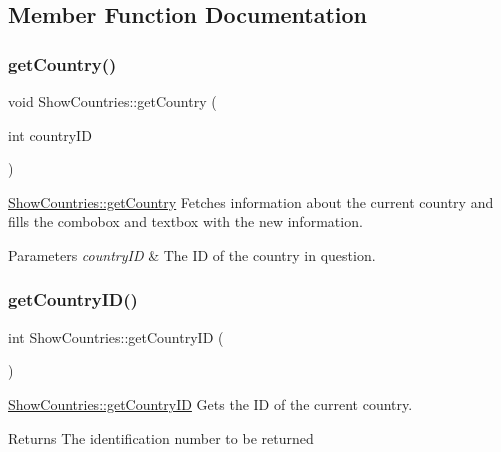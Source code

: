 \subsection{Member Function Documentation}
\mbox{\label{class_show_countries_a5f39325688b0e71fa613d5b33810ce02}} 
\subsubsection{\texorpdfstring{get\+Country()}{getCountry()}}
{\footnotesize\ttfamily void Show\+Countries\+::get\+Country (\begin{DoxyParamCaption}\item[{int}]{country\+ID }\end{DoxyParamCaption})}



\hyperlink{class_show_countries_a5f39325688b0e71fa613d5b33810ce02}{Show\+Countries\+::get\+Country} Fetches information about the current country and fills the combobox and textbox with the new information. 


\begin{DoxyParams}{Parameters}
{\em country\+ID} & The ID of the country in question. \\
\hline
\end{DoxyParams}
\mbox{\label{class_show_countries_a02956713871e89645487500f3c9b77b8}} 
\subsubsection{\texorpdfstring{get\+Country\+I\+D()}{getCountryID()}}
{\footnotesize\ttfamily int Show\+Countries\+::get\+Country\+ID (\begin{DoxyParamCaption}{ }\end{DoxyParamCaption})}



\hyperlink{class_show_countries_a02956713871e89645487500f3c9b77b8}{Show\+Countries\+::get\+Country\+ID} Gets the ID of the current country. 

\begin{DoxyReturn}{Returns}
The identification number to be returned 
\end{DoxyReturn}
\mbox{\label{class_show_countries_afc6d5f6817bd4c9388aef3d52d09d768}} 
